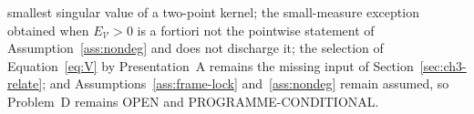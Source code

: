 smallest singular value of a two-point kernel; the small-measure exception obtained when \(E_{\mathcal V}>0\) is a fortiori not the pointwise statement of Assumption~\ref{ass:nondeg} and does not discharge it; the selection of Equation~\eqref{eq:V} by Presentation~A remains the missing input of Section~\ref{sec:ch3-relate}; and Assumptions~\ref{ass:frame-lock} and~\ref{ass:nondeg} remain assumed, so Problem~D remains OPEN and PROGRAMME-CONDITIONAL.
